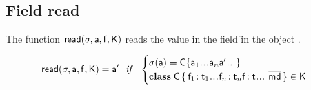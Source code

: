 \documentclass[acmlarge, anonymous, authordraft]{acmart}
\begin{document}
~\\

\begin{mathpar}










\end{mathpar}


\subsection{Field read}

The function $\readf\s\a\f\K$ reads the value in the field \f in the object \a.

\begin{equation*}
\readf \s\a\f\K = \ap 
  ~~\mathit{if}~~ \begin{cases}  \s(\a) = \obj\C{\a_1\dots\a_n \ap \dots}\\
 \Class\C {\Fdef{\f_1}{\t_1}\dots\Fdef{\f_n}{\t_n}\Ftype\f\t\dots}{\b\md}\in\K
 \end{cases}
\end{equation*}
\end{document}
